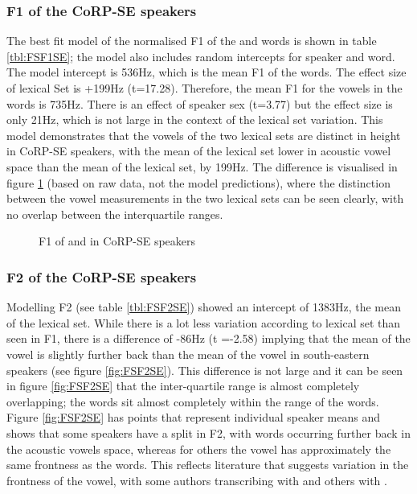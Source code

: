 \documentclass[../../../00.FullDoc/tex/ThesisSkeleton-draft2]{subfiles}
\begin{document}
\subsubsection{F1 of the CoRP-SE speakers} \label{subsubsec:SEF1}
The best fit model of the normalised F1 of the \foot{}  and \strutt{}  words is shown in table \ref{tbl:FSF1SE}; the model also includes random intercepts for speaker and word. The model intercept is 536Hz, which is the mean F1 of the \foot{} words. The effect size of lexical Set is +199Hz (t=17.28). Therefore, the mean F1 for the vowels in the \strutt{} words is 735Hz. There is an effect of speaker sex (t=3.77) but the effect size is only 21Hz, which is not large in the context of the lexical set variation. This model demonstrates that the vowels of the two lexical sets are distinct in height in CoRP-SE speakers, with the mean of the \strutt{} lexical set lower in acoustic vowel space than the mean of the \foot{} lexical set, by 199Hz. The difference is visualised in figure \ref{fig:FSF1SE} (based on raw data, not the model predictions), where the distinction between the vowel measurements in the two lexical sets can be seen clearly, with no overlap between the interquartile ranges.



\begin{figure}[h]
	\centering
	
	\caption{F1 of \foot{} and \strutt{} in CoRP-SE speakers} \label{fig:FSF1SE}
\end{figure}

\subsubsection{F2 of the CoRP-SE speakers} \label{subsubsec:SEF2}
Modelling F2 (see table \ref{tbl:FSF2SE}) showed an intercept of 1383Hz, the mean of the \foot{} lexical set. While there is a lot less variation according to lexical set than seen in F1, there is a difference of -86Hz (t =-2.58) implying that the mean of the \strutt{} vowel is slightly further back than the mean of the \foot{} vowel in south-eastern speakers (see figure \ref{fig:FSF2SE}). This difference is not large and it can be seen in figure \ref{fig:FSF2SE} that the inter-quartile range is almost completely overlapping; the \strutt{} words sit almost completely within the range of the \foot{} words. Figure \ref{fig:FSF2SE} has points that represent individual speaker means and shows that some speakers have a split in F2, with \strutt{} words occurring further back in the acoustic vowels space, whereas for others the \strutt{} vowel has approximately the same frontness as the \foot{} words. This reflects literature that suggests variation in the frontness of the \strutt{} vowel, with some authors transcribing with \textturna{} and others with \textturnv{}.
\end{document}
